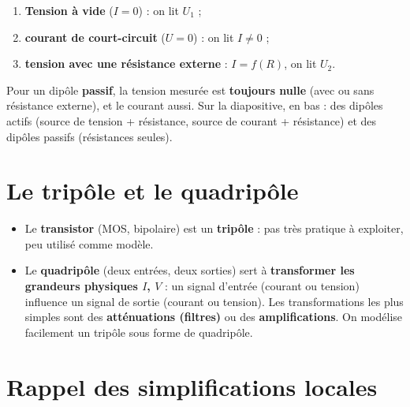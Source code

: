 \begin{propbox}[title=Les trois mesures qui identifient la nature du dipôle]
\begin{enumerate}
  \item \textbf{Tension à vide} ($I = 0$) : on lit $U_1$ ;
  \item \textbf{courant de court-circuit} ($U = 0$) : on lit $I \neq 0$ ;
  \item \textbf{tension avec une résistance externe} : $I = f(R)$, on lit $U_2$.
\end{enumerate}
Pour un dipôle \textbf{passif}, la tension mesurée est \textbf{toujours nulle} (avec ou sans
résistance externe), et le courant aussi. Sur la diapositive, en bas : des dipôles actifs
(source de tension + résistance, source de courant + résistance) et des dipôles passifs
(résistances seules).
\end{propbox}

\section{Le tripôle et le quadripôle}


\begin{defnbox}[title=Tripôle et quadripôle]
\begin{itemize}
  \item Le \textbf{transistor} (MOS, bipolaire) est un \textbf{tripôle} : pas très pratique
        à exploiter, peu utilisé comme modèle.
  \item Le \textbf{quadripôle} (deux entrées, deux sorties) sert à \textbf{transformer les
        grandeurs physiques $I$, $V$} : un signal d'entrée (courant ou tension) influence un
        signal de sortie (courant ou tension). Les transformations les plus simples sont des
        \textbf{atténuations (filtres)} ou des \textbf{amplifications}. On modélise facilement
        un tripôle sous forme de quadripôle.
\end{itemize}
\end{defnbox}

\section{Rappel des simplifications locales}


